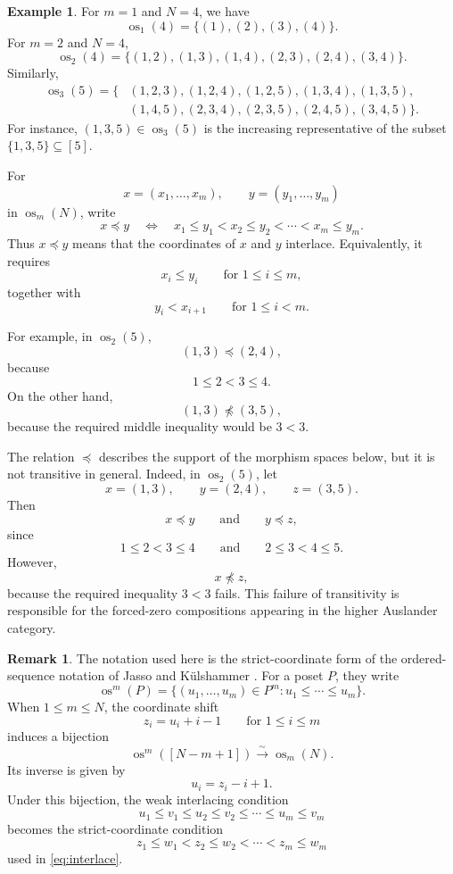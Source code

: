 \documentclass[12pt,a4paper,english,reqno]{amsart}
\theoremstyle{plain}
\theoremstyle{definition}
\newtheorem{exm}[theorem]{Example}
\newtheorem{remark}[theorem]{Remark}
\newcommand{\os}{\operatorname{os}}
\begin{document}
\begin{exm}

For $m=1$ and $N=4$, we have
\[
\os_1(4)=\{(1),(2),(3),(4)\}.
\]
For $m=2$ and $N=4$,
\[
\os_2(4)
=
\{(1,2),(1,3),(1,4),(2,3),(2,4),(3,4)\}.
\]
Similarly,
\[
\begin{split}
\os_3(5)=\{&
(1,2,3),(1,2,4),(1,2,5),(1,3,4),(1,3,5),\\
&
(1,4,5),(2,3,4),(2,3,5),(2,4,5),(3,4,5)
\}.
\end{split}
\]
For instance, $(1,3,5)\in\os_3(5)$ is the increasing representative
of the subset $\{1,3,5\}\subseteq[5]$.

For
\[
x=(x_1,\ldots,x_m),\qquad
y=(y_1,\ldots,y_m)
\]
in $\os_m(N)$, write
\begin{equation}
x\preceq y
\quad\Longleftrightarrow\quad
x_1\leq y_1<x_2\leq y_2<\cdots<x_m\leq y_m.
\label{eq:interlace}
\end{equation}
Thus $x\preceq y$ means that the coordinates of $x$ and $y$
interlace. Equivalently, it requires
\[
x_i\leq y_i
\qquad\text{for }1\leq i\leq m,
\]
together with
\[
y_i<x_{i+1}
\qquad\text{for }1\leq i<m.
\]

For example, in $\os_2(5)$,
\[
(1,3)\preceq(2,4),
\]
because
\[
1\leq2<3\leq4.
\]
On the other hand,
\[
(1,3)\npreceq(3,5),
\]
because the required middle inequality would be $3<3$.

The relation $\preceq$ describes the support of the morphism spaces
below, but it is not transitive in general. Indeed, in $\os_2(5)$, let
\[
x=(1,3),\qquad y=(2,4),\qquad z=(3,5).
\]
Then
\[
x\preceq y
\qquad\text{and}\qquad
y\preceq z,
\]
since
\[
1\leq2<3\leq4
\qquad\text{and}\qquad
2\leq3<4\leq5.
\]
However,
\[
x\npreceq z,
\]
because the required inequality $3<3$ fails. This failure of
transitivity is responsible for the forced-zero compositions appearing
in the higher Auslander category.
\end{exm}



\begin{remark}
The notation used here is the strict-coordinate form of the
ordered-sequence notation of Jasso and K\"ulshammer
\cite[Definition~1.9]{JassoKulshammer}. For a poset $P$, they write
\[
\operatorname{os}^{m}(P)
=
\{(u_1,\ldots,u_m)\in P^m:
u_1\leq\cdots\leq u_m\}.
\]
When $1\leq m\leq N$, the coordinate shift
\[
z_i=u_i+i-1
\qquad\text{for }1\leq i\leq m
\]
induces a bijection
\[
\operatorname{os}^{m}([N-m+1])
\xrightarrow{\sim}
\os_m(N).
\]
Its inverse is given by
\[
u_i=z_i-i+1.
\]
Under this bijection, the weak interlacing condition
\[
u_1\leq v_1\leq u_2\leq v_2
\leq\cdots\leq u_m\leq v_m
\]
becomes the strict-coordinate condition
\[
z_1\leq w_1<z_2\leq w_2
<\cdots<z_m\leq w_m
\]
used in \eqref{eq:interlace}.
\end{remark}
\end{document}
